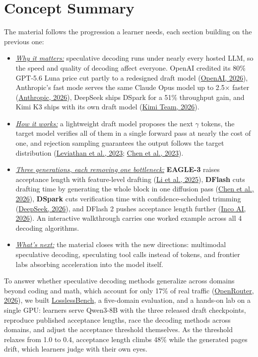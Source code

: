 \documentclass{article}
\begin{document}
\section{Concept Summary}
The material follows the progression a learner needs, each section building on the previous one:
\begin{itemize}
  \item \underline{\emph{Why it matters:}} speculative decoding runs under nearly every hosted LLM, so the speed and quality of decoding affect everyone. OpenAI credited its 80\% GPT-5.6 Luna price cut partly to a redesigned draft model (\href{https://community.openai.com/t/announcing-a-major-price-drop-for-5-6-terra-and-luna-and-fast-mode-for-5-6-sol/1388484}{OpenAI, 2026}), Anthropic's fast mode serves the same Claude Opus model up to 2.5$\times$ faster (\href{https://platform.claude.com/docs/en/build-with-claude/fast-mode}{Anthropic, 2026}), DeepSeek ships DSpark for a 51\% throughput gain, and Kimi K3 ships with its own draft model (\href{https://arxiv.org/abs/2607.24653}{Kimi Team, 2026}).
  \item \underline{\emph{How it works:}} a lightweight draft model proposes the next $\gamma$ tokens, the target model verifies all of them in a single forward pass at nearly the cost of one, and rejection sampling guarantees the output follows the target distribution (\href{https://arxiv.org/abs/2211.17192}{Leviathan et al., 2023}; \href{https://arxiv.org/abs/2302.01318}{Chen et al., 2023}).
  \item \underline{\emph{Three generations, each removing one bottleneck:}} \textbf{EAGLE-3} raises acceptance length with feature-level drafting (\href{https://arxiv.org/abs/2503.01840}{Li et al., 2025}), \textbf{DFlash} cuts drafting time by generating the whole block in one diffusion pass (\href{https://arxiv.org/abs/2602.06036}{Chen et al., 2026}), \textbf{DSpark} cuts verification time with confidence-scheduled trimming (\href{https://arxiv.org/abs/2607.05147}{DeepSeek, 2026}), and DFlash 2 pushes acceptance length further (\href{https://inco.ai/blog/dflash2/}{Inco AI, 2026}). An interactive walkthrough carries one worked example across all 4 decoding algorithms.
  \item \underline{\emph{What's next:}} the material closes with the new directions: multimodal speculative decoding, speculating tool calls instead of tokens, and frontier labs absorbing acceleration into the model itself.
\end{itemize}

To answer whether speculative decoding methods generalize across domains beyond coding and math, which account for only 17\% of real traffic (\href{https://openrouter.ai/rankings}{OpenRouter, 2026}), we built \href{https://lilyzh.ng/writing/losslessbench/}{LosslessBench}, a five-domain evaluation, and a hands-on lab on a single GPU: learners serve Qwen3-8B with the three released draft checkpoints, reproduce published acceptance lengths, race the decoding methods across domains, and adjust the acceptance threshold themselves. As the threshold relaxes from 1.0 to 0.4, acceptance length climbs 48\% while the generated pages drift, which learners judge with their own eyes.
\end{document}
